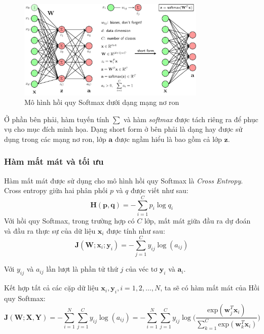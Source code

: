 \begin{figure}[h!]
    \centering
    \includegraphics[width=0.8\textwidth]{figures/softmax_nn.png} %
    \caption{Mô hình hồi quy Softmax dưới dạng mạng nơ ron} %
    \label{fig:1} %
\end{figure}

Ở phần bên phải, hàm tuyến tính $\sum$ và hàm \emph{softmax} được tách riêng ra để phục vụ cho mục đích minh họa. Dạng short form ở bên phải là dạng hay được sử dụng trong các mạng nơ ron, lớp $\textbf{a}$ được ngầm hiểu là bao gồm cả lớp $\textbf{z}$.

\subsubsection{Hàm mất mát và tối ưu}

Hàm mất mát được sử dụng cho mô hình hồi quy Softmax là \emph{Cross Entropy}.
Cross entropy giữa hai phân phối $p$ và $q$ được viết như sau:
\begin{equation*}
    \textbf{H}(\textbf{p},\textbf{q}) = - \sum^C_{i=1}p_i\log q_i
\end{equation*}
Với hồi quy Softmax, trong trường hợp có $C$ lớp, mất mát giữa đầu ra dự đoán và đầu ra thực sự của dữ liệu $\textbf{x}_i$ được tính như sau:
\begin{equation*}
    \textbf{J}(\textbf{W};\textbf{x}_i;\textbf{y}_i) = - \sum^C_{j=1}y_{ij}\log(a_{ij})
\end{equation*}

Với $y_{ij}$ và $a_{ij}$ lần lượt là phần tử thứ $j$ của véc tơ $\textbf{y}_i$ và $\textbf{a}_i$.

Kết hợp tất cả các cặp dữ liệu $\textbf{x}_i, \textbf{y}_i, i = 1,2,\dots,N$, ta sẽ có hàm mất mát của Hồi quy Softmax:
\begin{equation*}
    \textbf{J}(\textbf{W};\textbf{X},\textbf{Y}) = - \sum^N_{i=1}\sum^C_{j=1}y_{ij}\log(a_{ij}) = - \sum^N_{i=1}\sum^C_{j=1}y_{ij}\log\Big(\frac{\text{exp}(\textbf{w}^T_j\textbf{x}_i)}{\sum^C_{k=1}\text{exp}(\textbf{w}^T_k\textbf{x}_i)}\Big)
\end{equation*}

